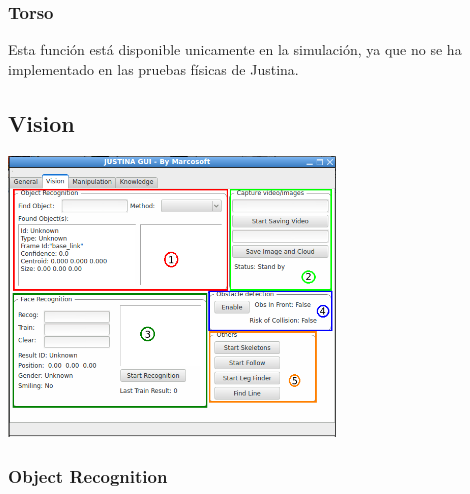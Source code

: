 \documentclass[user_manual.tex]{subfiles}
\begin{document}
\subsubsection{Torso}

Esta función está disponible unicamente en la simulación, ya que no se ha implementado en las pruebas físicas de Justina.

\subsection{Vision}

\begin{center}
\includegraphics[width=0.65\textwidth]{Figures/Puesta_marcha/Vision.png}
\end{center}

\subsubsection{Object Recognition}
\end{document}
